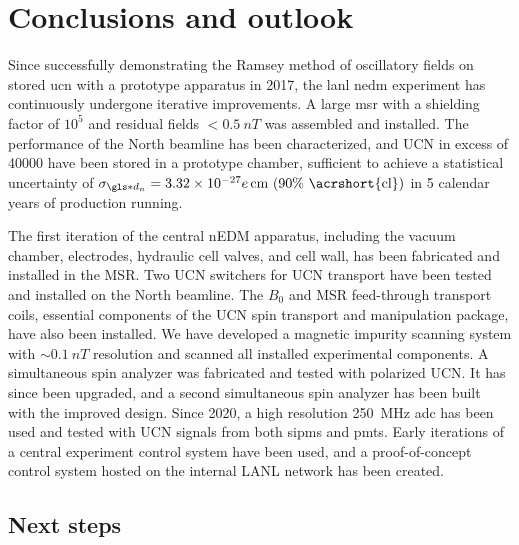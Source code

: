 
\chapter{Conclusions and outlook}\label{chap:conclusion}


Since successfully demonstrating the Ramsey method of oscillatory fields on stored \acrshort{ucn} with a prototype apparatus in 2017, the \acrshort{lanl} \acrshort{nedm} experiment has continuously undergone iterative improvements. A large \acrshort{msr} with a shielding factor of $10^5$ and residual fields $<\qty{0.5}{nT}$ was assembled and installed. The performance of the North beamline has been characterized, and UCN in excess of \num{40000} have been stored in a prototype chamber, sufficient to achieve a statistical uncertainty of $\sigma_{\gls*{d_n}}=\num{3.32e-27}e\,\text{cm (90\% \acrshort{cl})}$ in 5 calendar years of production running.

The first iteration of the central nEDM apparatus, including the vacuum chamber, electrodes, hydraulic cell valves, and cell wall, has been fabricated and installed in the MSR. Two UCN switchers for UCN transport have been tested and installed on the North beamline. The $B_0$ and MSR feed-through transport coils, essential components of the UCN spin transport and manipulation package, have also been installed. We have developed a magnetic impurity scanning system with $\sim \qty{0.1}{nT}$ resolution and scanned all installed experimental components. A simultaneous spin analyzer was fabricated and tested with polarized UCN. It has since been upgraded, and a second simultaneous spin analyzer has been built with the improved design. Since 2020, a high resolution \qty{250}{MHz} \acrshort{adc} has been used and tested with UCN signals from both \acrshort{sipm}s and \acrshort{pmt}s. Early iterations of a central experiment control system have been used, and a proof-of-concept control system hosted on the internal LANL network has been created.


\section{Next steps}


